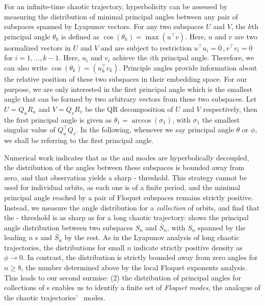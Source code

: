 For an infinite-time chaotic trajectory, hyperbolicity can be assessed by
measuring the distribution of minimal principal
angles between any pair of subspaces spanned by
Lyapunov vectors.
For any two subspaces $U$ and $V$, the $k$th principal angle
$\theta_k$ is defined as $\cos(\theta_k) = \max (u^\top v)$. Here,
$u$ and $v$ are two normalized vectors in $U$ and $V$ and
are subject to restriction $u^\top u_i = 0\,, v^\top v_i = 0$ for
$i = 1,\ldots,k-1$. Here, $u_i$ and $v_i$ achieve the $i$th principal
angle. Therefore, we can also write $\cos(\theta_k) = (u_k^\top v_k)$.
Principle angles provide information about the relative position of
these two subspaces in their embedding space. For our purpose, we are
only interested in the first principal angle which is the smallest
angle that can be formed by two arbitrary vectors from these two subspaces.
Let $U = Q_uR_u$ and $V = Q_vR_v$ be the QR decomposition of $U$ and $V$
respectively, then the first principal angle is given as
$\theta_1 = \arccos(\sigma_1)$, with $\sigma_1$ the smallest singular
value of $Q_u^\top Q_v$. In the following, whenever we say principal angle
$\theta$ or $\phi$, we shall be referring to the first principal angle.


Numerical work indicates that as the {\entangled} and {\transient} modes are
hyperbolically decoupled, the distribution of the angles between these
subspaces is bounded away from zero, and that observation yields a sharp
{\entangled}-{\transient} threshold.
This strategy cannot be used for individual orbits, as each one is of a
finite period, and the minimal principal angle reached by a pair of
Floquet subspaces remains strictly positive.
Instead, we measure the angle distribution for a \textit{collection} of
orbits, and find that the {\entangled}-{\transient} threshold is as sharp
as for a long chaotic trajectory:  shows the principal angle
distribution between two subspaces $S_n$ and $\bar{S}_n$, with $S_n$
spanned by the leading $n$ \Fv s and $\bar{S}_n$ by the rest.
As in the Lyapunov analysis of long chaotic trajectories, the
distributions for small $n$ indicate strictly positive density as
$\phi\to0$. In contrast, the
distribution is strictly bounded away from zero angles for $n\geq 8$,
the number determined above by the local Floquet exponents analysis.
This leads to our second surmise:
(2) the distribution of principal angles for collections of \po s enables
us to identify a finite set of {\em {\entangled} Floquet modes}, the
analogue of the chaotic trajectories'  {\entangled} \cLv\ modes.

